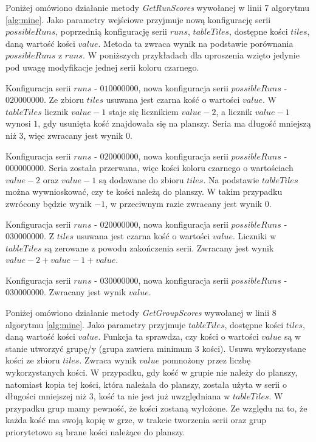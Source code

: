 Poniżej omówiono działanie metody \emph{GetRunScores} wywołanej w linii 7 algorytmu \ref{alg:mine}.
Jako parametry wejściowe przyjmuje nową konfigurację serii $possibleRuns$, poprzednią konfigurację serii $runs$, $tableTiles$, dostępne kości $tiles$, daną wartość kości $value$.  
Metoda ta zwraca wynik na podstawie porównania $possibleRuns$ z $runs$. W poniższych przykładach dla uproszenia wzięto jedynie pod uwagę modyfikacje jednej serii koloru czarnego.

\begin{example}
Konfiguracja serii $runs$ - $010000000$, nowa konfiguracja serii $possibleRuns$ - $020000000$. Ze zbioru $tiles$ usuwana jest czarna kość o wartości $value$. W $tableTiles$ licznik $value-1$ staje się licznikiem $value-2$, a licznik $value-1$ wynosi $1$, gdy usunięta kość znajdowała się na planszy. Seria ma długość mniejszą niż 3, więc zwracany jest wynik $0$. 
\end{example}

\begin{example}
Konfiguracja serii $runs$ - $020000000$, nowa konfiguracja serii $possibleRuns$ - $000000000$.
Seria została przerwana, więc kości koloru czarnego o wartościach $value-2$ oraz $value-1$ są dodawane do zbioru $tiles$. Na podstawie $tableTiles$ można wywnioskować, czy te kości należą do planszy. W takim przypadku zwrócony będzie wynik $-1$, w przeciwnym razie zwracany jest wynik $0$. 
\end{example}

\begin{example}
Konfiguracja serii $runs$ - $020000000$, nowa konfiguracja serii $possibleRuns$ - $030000000$.
Z $tiles$ usuwana jest czarna kość o wartości $value$. Liczniki w $tableTiles$ są zerowane z powodu zakończenia serii. Zwracany jest wynik $value-2 + value-1 + value$. \end{example}

\begin{example}
Konfiguracja serii $runs$ - $030000000$, nowa konfiguracja serii $possibleRuns$ - $030000000$.
Zwracany jest wynik $value$. 
\end{example}

Poniżej omówiono działanie metody \emph{GetGroupScores} wywołanej w linii 8 algorytmu \ref{alg:mine}.
Jako parametry przyjmuje $tableTiles$, dostępne kości $tiles$, daną wartość kości $value$.  
Funkcja ta sprawdza, czy kości o wartości $value$ są w stanie utworzyć grupę/y (grupa zawiera minimum $3$ kości). Usuwa wykorzystane kości ze zbioru $tiles$. Zwraca wynik $value$ pomnożony przez liczbę wykorzystanych kości. W przypadku, gdy kość w grupie nie należy do planszy, natomiast kopia tej kości, która należała do planszy, została użyta w serii o długości mniejszej niż $3$, kość ta nie jest już uwzględniana w $tableTiles$. W przypadku grup mamy pewność, że kości zostaną wyłożone. Ze względu na to, że każda kość ma swoją kopię w grze, w trakcie tworzenia serii oraz grup priorytetowo są brane kości należące do planszy. 




